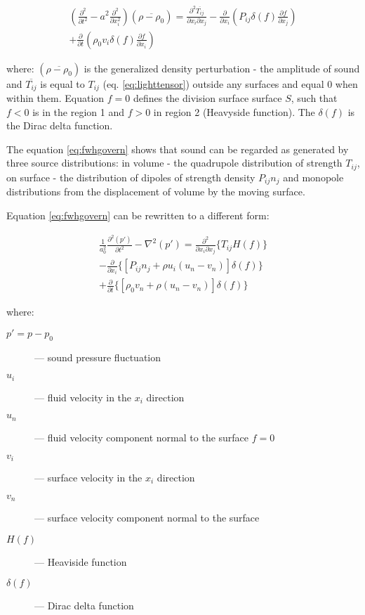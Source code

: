 \begin{equation} \label{eq:fwhgovern}
\begin{split}
\left( \frac{\partial^2}{\partial t^2} - a^2 \frac{\partial^2}{\partial x_i^2} \right)
\left( \overline{\rho - \rho_0} \right)
=
\frac{\partial^2 \overline{T_{ij}}}{\partial x_i \partial x_j}
- \frac{\partial}{\partial x_i} \left( P_{ij} \delta(f) \frac{\partial f}{\partial x_j} \right) \\
+ \frac{\partial}{\partial t} \left( \rho_0 v_i \delta(f) \frac{\partial f}{\partial x_i} \right)
\end{split}
\end{equation}

\noindent where: $\left( \overline{\rho - \rho_0} \right)$ is the generalized density perturbation - the amplitude of sound and $\overline{T_{ij}}$ is equal to $T_{ij}$ (eq. \ref{eq:lighttensor}) outside any surfaces and equal 0 when within them. Equation $f=0$ defines the division surface surface $S$, such that $f<0$ is in the region 1 and $f>0$ in region 2 (Heavyside function). The $\delta(f)$ is the Dirac delta function. 

The equation \ref{eq:fwhgovern} shows that sound can be regarded as generated by three source distributions: in volume - the quadrupole distribution of strength $T_{ij}$, on surface - the distribution of dipoles of strength density $P_{ij}n_j$ and monopole distributions from the displacement of volume by the moving surface.

Equation \ref{eq:fwhgovern} can be rewritten to a different form:

\begin{equation} \label{eq:fwhfluent}
\begin{split}
\frac{1}{a_0^2} \frac{\partial^2 \left(p'\right)}{\partial t^2}- \nabla^2  \left(p'\right)
= \frac{\partial^2}{\partial x_i \partial x_j} \lbrace T_{ij} H \left(f\right) \rbrace \\
- \frac{\partial}{\partial x_i} \lbrace \left[ P_{ij}n_j + \rho u_i \left( u_n - v_n \right) \right] \delta(f) \rbrace \\
+ \frac{\partial}{\partial t} \lbrace \left[ \rho_0 v_n + \rho \left( u_n - v_n \right) \right] \delta(f) \rbrace
\end{split}
\end{equation}

\noindent where:

\begin{description}
\item[$p' = p - p_0$] --- sound pressure fluctuation
\item[$u_i$] --- fluid velocity in the $x_i$ direction
\item[$u_n$] --- fluid velocity component normal to the surface $f = 0$
\item[$v_i$] --- surface velocity in the $x_i$ direction
\item[$v_n$] --- surface velocity component normal to the surface
\item[$H(f)$] --- Heaviside function
\item[$\delta(f)$] --- Dirac delta function
\end{description}

